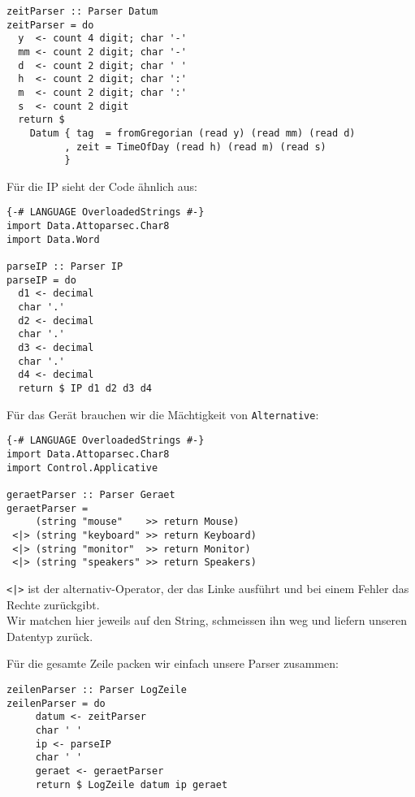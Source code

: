 \documentclass{beamer}
\begin{document}
\begin{frame}[fragile]
\begin{overprint}
\begin{verbatim}
zeitParser :: Parser Datum
zeitParser = do
  y  <- count 4 digit; char '-'
  mm <- count 2 digit; char '-'
  d  <- count 2 digit; char ' '
  h  <- count 2 digit; char ':'
  m  <- count 2 digit; char ':'
  s  <- count 2 digit
  return $
    Datum { tag  = fromGregorian (read y) (read mm) (read d)
          , zeit = TimeOfDay (read h) (read m) (read s)
          }
\end{verbatim}
\end{overprint}

\end{frame}

\begin{frame}[fragile]
Für die IP sieht der Code ähnlich aus:
\small
\begin{verbatim}
{-# LANGUAGE OverloadedStrings #-}
import Data.Attoparsec.Char8
import Data.Word

parseIP :: Parser IP
parseIP = do
  d1 <- decimal
  char '.'
  d2 <- decimal
  char '.'
  d3 <- decimal
  char '.'
  d4 <- decimal
  return $ IP d1 d2 d3 d4
\end{verbatim}
\normalsize
\end{frame}

\begin{frame}[fragile]
Für das Gerät brauchen wir die Mächtigkeit von \texttt{Alternative}:
\small
\begin{verbatim}
{-# LANGUAGE OverloadedStrings #-}
import Data.Attoparsec.Char8
import Control.Applicative

geraetParser :: Parser Geraet
geraetParser =
     (string "mouse"    >> return Mouse)
 <|> (string "keyboard" >> return Keyboard)
 <|> (string "monitor"  >> return Monitor)
 <|> (string "speakers" >> return Speakers)
\end{verbatim}
\normalsize
\pause
\texttt{<|>} ist der alternativ-Operator, der das Linke ausführt und bei einem Fehler das Rechte zurückgibt.\\
\pause
Wir matchen hier jeweils auf den String, schmeissen ihn weg und liefern unseren Datentyp zurück.
\end{frame}

\begin{frame}[fragile]
Für die gesamte Zeile packen wir einfach unsere Parser zusammen:
\small
\begin{verbatim}
zeilenParser :: Parser LogZeile
zeilenParser = do
     datum <- zeitParser
     char ' '
     ip <- parseIP
     char ' '
     geraet <- geraetParser
     return $ LogZeile datum ip geraet
\end{verbatim}
\normalsize
\end{frame}
\end{document}
